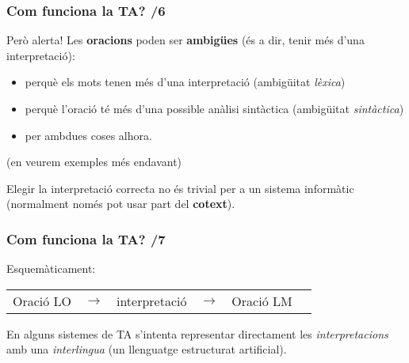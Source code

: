 \documentclass{beamer}
\newcommand{\empha}[1]{\emph{#1}\/}
\begin{document}
\begin{frame}
\frametitle{Com funciona la TA? /6}

Però alerta!  Les \textbf{oracions} poden ser \textbf{ambigües} (\'es
a dir, tenir m\'es d'una interpretaci\'o):

\begin{itemize}
\item perqu\`e els mots tenen m\'es d'una interpretaci\'{o}
  (ambig\"uitat \empha{l\`exica})
 

\item perqu\`{e} l'oraci\'{o} t\'{e} m\'{e}s d'una possible an\`alisi
  sint\`actica (ambig\"uitat \empha{sint\`actica})

\item per ambdues coses alhora.
\end{itemize}
(en veurem exemples més endavant)

Elegir la interpretaci\'{o} correcta no \'es trivial per a un sistema
  inform\`atic (normalment només pot usar part del \textbf{cotext}).


\end{frame} 




\begin{frame}
\frametitle{ Com funciona la TA? /7}

Esquemàticament:

{
{
\begin{center}
\begin{tabular}{cccccc}
\parbox{1.8cm}{Oració LO}
& $\to$ 
& interpretació 
& $\to$ 
& \parbox{1.8cm}{Oració LM} \\ 
\end{tabular}
\end{center}
}

{ En alguns sistemes de TA s'intenta representar directament les
  \empha{interpretacions} amb una \empha{interlingua} (un llenguatge estructurat
  artificial).}  }
\end{frame}
\end{document}
